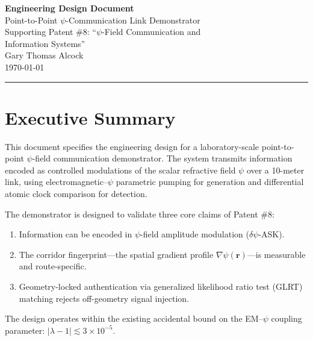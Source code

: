 \documentclass[11pt,onecolumn]{article}
\begin{document}
\begin{center}
{\LARGE\bfseries Engineering Design Document}\\[6pt]
{\Large Point-to-Point $\psi$-Communication Link Demonstrator}\\[12pt]
{\large Supporting Patent \#8: ``$\psi$-Field Communication and\\
Information Systems''}\\[6pt]
{\large Gary Thomas Alcock}\\[3pt]
{\large\today}\\[6pt]
\rule{\textwidth}{0.5pt}
\end{center}

\vspace{12pt}

\tableofcontents
\newpage

\section{Executive Summary}

This document specifies the engineering design for a laboratory-scale
point-to-point $\psi$-field communication demonstrator.
The system transmits information encoded as controlled modulations of
the scalar refractive field $\psi$ over a 10-meter link, using
electromagnetic--$\psi$ parametric pumping for generation and
differential atomic clock comparison for detection.

The demonstrator is designed to validate three core claims of Patent \#8:
\begin{enumerate}
\item Information can be encoded in $\psi$-field amplitude modulation
($\delta\psi$-ASK).
\item The corridor fingerprint---the spatial gradient profile
$\nabla\psi(\mathbf{r})$---is measurable and route-specific.
\item Geometry-locked authentication via generalized likelihood ratio
test (GLRT) matching rejects off-geometry signal injection.
\end{enumerate}

The design operates within the existing accidental bound on the
EM--$\psi$ coupling parameter: $|\lambda - 1| \lesssim 3 \times 10^{-5}$.

\end{document}
